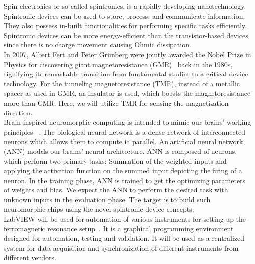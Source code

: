 \documentclass[12pt,a4paper,bold]{thesis}
\theoremstyle{thm}
\theoremstyle{definition}
\begin{document}
Spin-electronics or so-called spintronics, is a rapidly developing nanotechnology. Spintronic
devices can be used to store, process, and communicate information. They also possess in-built functionalities for performing specific tasks efficiently. Spintronic devices can be more energy-efficient than the transistor-based devices since there is no charge movement causing Ohmic dissipation.\\ 
\indent \indent In 2007, Albert Fert and Peter Gr{\"u}nberg were jointly awarded the Nobel Prize in Physics for discovering giant magnetoresistance (GMR)~\cite{baibich1988giant, binasch1989enhanced} back in the 1980s, signifying its remarkable transition from fundamental studies to a critical device technology. For the tunneling magnetoresistance (TMR), instead of a metallic spacer as used in GMR, an insulator is used, which boosts the magnetoresistance more than GMR. Here, we will utilize TMR for sensing the magnetization direction.\\
\indent \indent Brain-inspired neuromorphic computing is intended to mimic our brains' working principles ~\cite{poon2011neuromorphic,yon1958computer}. The biological neural network is a dense network of interconnected neurons which allows them to compute in parallel. An artificial neural network (ANN) models our brains’ neural architecture. ANN is composed of neurons, which perform two primary tasks: Summation of the weighted inputs and applying the activation function on the summed input depicting the firing of a neuron. In the training phase, ANN is trained to get the optimizing parameters of weights and bias. We expect the ANN to perform the desired task with unknown inputs in the evaluation phase. The target is to build such neuromorphic chips using the novel spintronic device concepts.\\
\indent \indent LabVIEW will be used for automation of various instruments for setting up the ferromagnetic resonance setup~\cite{ni}. It is a graphical programming environment designed for automation, testing and validation. It will be used as a centralized system for data acquisition and synchronization of different instruments from different vendors. 
   
\end{document}
